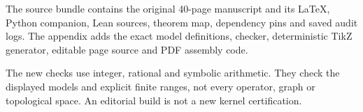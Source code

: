 The source bundle contains the original 40-page manuscript and its LaTeX, Python companion, Lean sources, theorem map, dependency pins and saved audit logs. The appendix adds the exact model definitions, checker, deterministic TikZ generator, editable page source and PDF assembly code.

The new checks use integer, rational and symbolic arithmetic. They check the displayed models and explicit finite ranges, not every operator, graph or topological space. An editorial build is not a new kernel certification.

